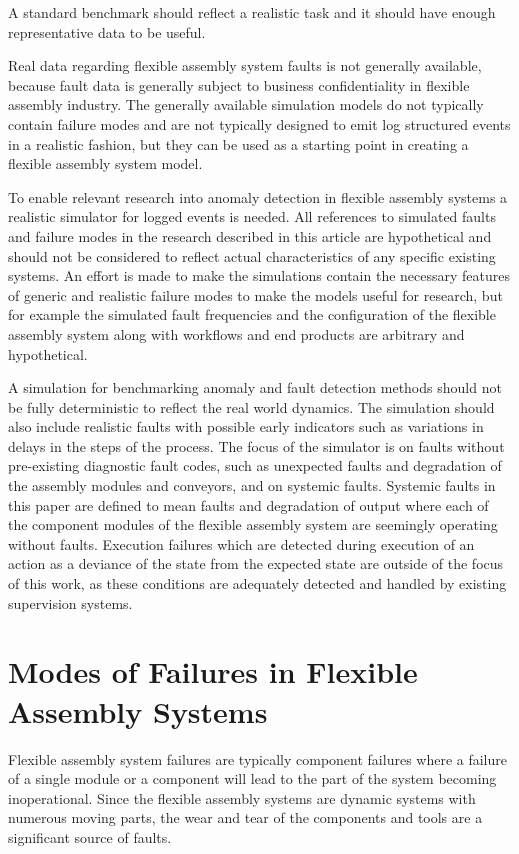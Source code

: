 \documentclass[journal]{IEEEtran}
\begin{document}
A standard benchmark should reflect a realistic task and it should have enough representative data to be useful.

Real data regarding flexible assembly system faults is
not generally available, because fault data is generally subject to business confidentiality in flexible assembly industry.
The generally available simulation models do not typically contain failure modes and are not typically designed to emit
log structured events in a realistic fashion, but they can be used as a starting point in creating a flexible assembly system model.

To enable relevant research into anomaly detection in flexible assembly systems a realistic simulator for logged events is needed.
All references to simulated faults and failure modes in the research described in this article are hypothetical and should not be considered to
reflect actual characteristics of any specific existing systems. An effort is made to make the simulations contain the necessary features of
generic and realistic failure modes to make the models useful for research, but for example the simulated fault frequencies and the configuration
of the flexible assembly system along with workflows and end products are arbitrary and hypothetical.

A simulation for benchmarking anomaly and fault detection methods should not be fully deterministic to reflect the real world dynamics. The simulation should also
include realistic faults with possible early indicators such as variations in delays in the steps of the process. The focus of the simulator is on faults without pre-existing
diagnostic fault codes, such as unexpected faults and degradation of the assembly modules and conveyors, and on systemic faults. Systemic faults in this paper
are defined to mean faults and degradation of output where each of the component modules of the flexible assembly system are seemingly operating without faults. Execution failures
which are detected during execution of an action as a deviance of the state from the expected state are outside of the focus of this work, as these conditions are adequately detected and handled
by existing supervision systems.

\section{Modes of Failures in Flexible Assembly Systems}

Flexible assembly system failures are typically component failures where a failure of a single module or a component will lead to the part of the system becoming inoperational.
Since the flexible assembly systems are dynamic systems with numerous moving parts, the wear and tear of the components and tools are a significant source of faults.
\end{document}
